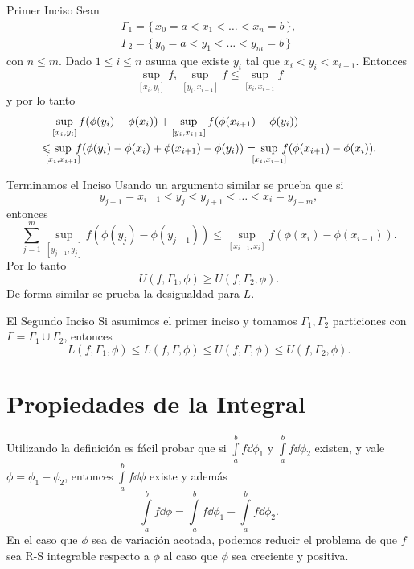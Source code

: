 \documentclass[utf8]{beamer}
\theoremstyle{plain}
\theoremstyle{definition}
\theoremstyle{remark}
\numberwithin{equation}{section}
\newcommand{\Ga}{\Gamma}                %
\newcommand{\set}[1]{\{\,#1\,\}}    %
\renewcommand{\geq}{\geqslant}          %
\renewcommand{\leq}{\leqslant}          %
\renewcommand{\.}{\Cdot}                %
\begin{document}
 \begin{frame}{Primer Inciso}
   Sean 
   \begin{gather*}
    \Ga_1=\set{x_0=a<x_1<\dots<x_n=b},\\
    \Ga_2=\set{y_0=a<y_1<\dots<y_m=b}
   \end{gather*}
   con $n\leq m$. Dado $1\leq i\leq n$ asuma que existe $y_i$ tal que $x_i<y_i<x_{i+1}$. Entonces
   $$\sup_{[x_i,y_i]}f,\sup_{[y_i,x_{i+1}]}f\leq \sup_{[x_i,x_{i+1}}f$$
   y por lo tanto
   \begin{align*}
    &\sup_{[x_i,y_i]}f(\phi(y_i)-\phi(x_i))+\sup_{[y_i,x_{i+1}]}f(\phi(x_{i+1})-\phi(y_i))\\
    \leq&\hspace{-6pt}\sup_{[x_i,x_{i+1}]}\hspace{-6pt}f(\phi(y_i)-\phi(x_i)+\phi(x_{i+1})-\phi(y_i))
    =\hspace{-6pt}\sup_{[x_i,x_{i+1}]}\hspace{-6pt}f(\phi(x_{i+1})-\phi(x_i)).
   \end{align*}
 \end{frame}

 \begin{frame}{Terminamos el Inciso}
   Usando un argumento similar se prueba que si 
   $$y_{j-1}=x_{i-1}<y_j<y_{j+1}<\dots<x_i=y_{j+m},$$
   entonces
   $$\sum_{j=1}^m\sup_{[y_{j-1},y_j]}f(\phi(y_j)-\phi(y_{j-1}))\leq\sup_{[x_{i-1},x_i]}f(\phi(x_{i})-\phi(x_{i-1})).$$
   Por lo tanto 
   $$U(f,\Ga_1,\phi)\geq U(f,\Ga_2,\phi).$$
   De forma similar se prueba la desigualdad para $L$.
 \end{frame}

 \begin{frame}{El Segundo Inciso}
Si asumimos el primer inciso y tomamos $\Ga_1,\Ga_2$ particiones con $\Ga=\Ga_1\cup \Ga_2$, entonces
$$L(f,\Ga_1,\phi)\leq L(f,\Ga,\phi)\leq U(f,\Ga,\phi)\leq U(f,\Ga_2,\phi).$$ 
 \end{frame}

 \section{Propiedades de la Integral}

 \begin{frame}
   Utilizando la definición es fácil probar que si $\int\limits_a^bf\dd\phi_1$ y $\int\limits_a^bf\dd\phi_2$ existen, y vale $\phi=\phi_1-\phi_2$, entonces $\int\limits_a^bf\dd\phi$ existe y además 
   $$\int\limits_a^bf\dd\phi=\int\limits_a^bf\dd\phi_1-\int\limits_a^bf\dd\phi_2.$$
   En el caso que $\phi$ sea de variación acotada, podemos reducir el problema de que $f$ sea R-S integrable respecto a $\phi$ al caso que $\phi$ sea creciente y positiva.
 \end{frame}
\end{document}
